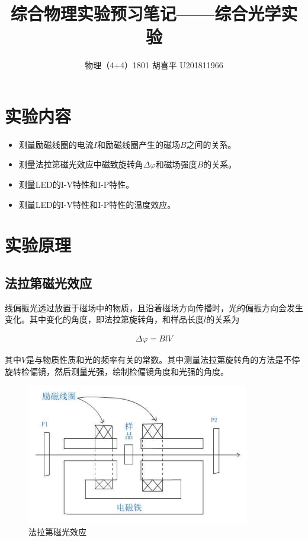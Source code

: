 \documentclass{article}
\author{物理（4+4）1801 \quad  胡喜平 \quad U201811966}
\affil{个人网站 https://hxp.plus/ \quad 电子邮件 hxp201406@gmail.com}
\title{综合物理实验预习笔记——综合光学实验}
\begin{document}
\maketitle\thispagestyle{fancy}

\section{实验内容}

\begin{itemize}
\item 测量励磁线圈的电流$I$和励磁线圈产生的磁场$B$之间的关系。
\item 测量法拉第磁光效应中磁致旋转角$\Delta \varphi$和磁场强度$B$的关系。
\item 测量LED的I-V特性和I-P特性。
\item 测量LED的I-V特性和I-P特性的温度效应。
\end{itemize}

\section{实验原理}

\subsection{法拉第磁光效应}

线偏振光透过放置于磁场中的物质，且沿着磁场方向传播时，光的偏振方向会发生变化。其中变化的角度，即法拉第旋转角，和样品长度$l$的关系为

\begin{equation*}
  \begin{aligned}
    \Delta \varphi = BlV
  \end{aligned}
\end{equation*}

其中$V$是与物质性质和光的频率有关的常数。其中测量法拉第旋转角的方法是不停旋转检偏镜，然后测量光强，绘制检偏镜角度和光强的角度。

\begin{figure}[H]
  \centering
  \includegraphics[width=0.5\linewidth]{figures/法拉第磁光效应}
  \caption{法拉第磁光效应}
  \label{fig:法拉第磁光效应}
\end{figure}
\end{document}
